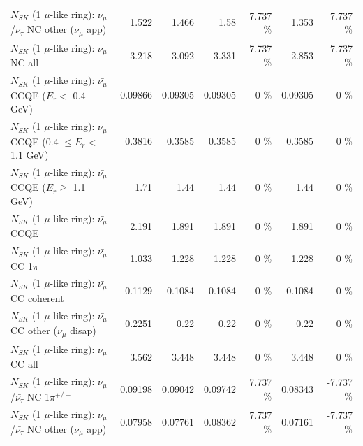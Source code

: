 \begin{table}
\begin{tabular}{| l | r | r | r  r | r  r |}
     $N_{SK}$ (1 $\mu$-like ring): $\nu_\mu$/$\nu_\tau$ NC other ($\nu_\mu$ app) &           1.522 &           1.466 &            1.58 &    7.737 \%  &           1.353 &   -7.737 \%  \\ 
                                $N_{SK}$ (1 $\mu$-like ring): $\nu_{\mu}$ NC all &           3.218 &           3.092 &           3.331 &    7.737 \%  &           2.853 &   -7.737 \%  \\ 
\hline
\hline
\hline
          $N_{SK}$ (1 $\mu$-like ring): $\bar{\nu_\mu}$ CCQE ($E_{r} <$ 0.4 GeV) &         0.09866 &         0.09305 &         0.09305 &        0 \%  &         0.09305 &        0 \%  \\ 
 $N_{SK}$ (1 $\mu$-like ring): $\bar{\nu_\mu}$ CCQE (0.4 $\leq E_{r} <$ 1.1 GeV) &          0.3816 &          0.3585 &          0.3585 &        0 \%  &          0.3585 &        0 \%  \\ 
       $N_{SK}$ (1 $\mu$-like ring): $\bar{\nu_\mu}$ CCQE ($E_{r} \geq$ 1.1 GeV) &            1.71 &            1.44 &            1.44 &        0 \%  &            1.44 &        0 \%  \\ 
\hline
                              $N_{SK}$ (1 $\mu$-like ring): $\bar{\nu_\mu}$ CCQE &           2.191 &           1.891 &           1.891 &        0 \%  &           1.891 &        0 \%  \\ 
                         $N_{SK}$ (1 $\mu$-like ring): $\bar{\nu_\mu}$ CC 1$\pi$ &           1.033 &           1.228 &           1.228 &        0 \%  &           1.228 &        0 \%  \\ 
                       $N_{SK}$ (1 $\mu$-like ring): $\bar{\nu_\mu}$ CC coherent &          0.1129 &          0.1084 &          0.1084 &        0 \%  &          0.1084 &        0 \%  \\ 
        $N_{SK}$ (1 $\mu$-like ring): $\bar{\nu_\mu}$ CC other ($\nu_\mu$ disap) &          0.2251 &            0.22 &            0.22 &        0 \%  &            0.22 &        0 \%  \\ 
                          $N_{SK}$ (1 $\mu$-like ring): $\bar{\nu_{\mu}}$ CC all &           3.562 &           3.448 &           3.448 &        0 \%  &           3.448 &        0 \%  \\ 
\hline
  $N_{SK}$ (1 $\mu$-like ring): $\bar{\nu_\mu}$/$\bar{\nu_\tau}$ NC 1$\pi^{+/-}$ &         0.09198 &         0.09042 &         0.09742 &    7.737 \%  &         0.08343 &   -7.737 \%  \\ 
$N_{SK}$ (1 $\mu$-like ring): $\bar{\nu_\mu}$/$\bar{\nu_\tau}$ NC other ($\nu_\mu$ app) &         0.07958 &         0.07761 &         0.08362 &    7.737 \%  &         0.07161 &   -7.737 \%  \\ 

\end{tabular}
\end{table}
